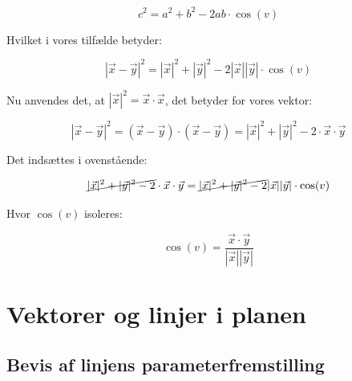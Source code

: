 \documentclass{article}
\makeatletter
\newenvironment{proofw}{\par
  \pushQED{\qed}%
  \normalfont \topsep6\p@\@plus6\p@\relax
  \trivlist
  \item[]\ignorespaces
}{%
  \popQED\endtrivlist\@endpefalse
}
\makeatother
\begin{document}
\begin{proofw}
$$
    c^2=a^2+b^2-2ab \cdot \cos(v)
$$

Hvilket i vores tilfælde betyder:

$$
    |\vec{x}-\vec{y}|^2=|\vec{x}|^2+|\vec{y}|^2-2|\vec{x}||\vec{y}| \cdot \cos(v)
$$

Nu anvendes det, at $|\vec{x}|^2=\vec{x} \cdot \vec{x}$, det betyder for vores vektor:

$$
    |\vec{x}-\vec{y}|^2=(\vec{x}-\vec{y})\cdot (\vec{x}-\vec{y})
    =|\vec{x}|^2+|\vec{y}|^2-2 \cdot \vec{x}\cdot \vec{y}
$$

Det indsættes i ovenstående:

$$
\cancel{|\vec{x}|^2+|\vec{y}|^2-2} \cdot \vec{x}\cdot \vec{y}
=\cancel{|\vec{x}|^2+|\vec{y}|^2-2}|\vec{x}||\vec{y}| \cdot \cos(v)
$$

Hvor $\cos(v)$ isoleres:

$$
    \cos(v)=\frac{
        \vec{x} \cdot \vec{y}
    }{
        |\vec{x}||\vec{y}|
    }
$$
\end{proofw}

\pagebreak

\section{Vektorer og linjer i planen}

\subsection{Bevis af linjens parameterfremstilling}
\end{document}
